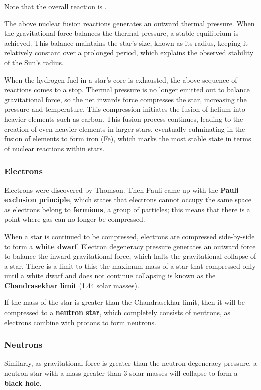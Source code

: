 \documentclass[12pt,a4paper]{article}
\begin{document}
Note that the overall reaction is .

The above nuclear fusion reactions generates an outward thermal pressure. When the gravitational force balances the thermal pressure, a stable equilibrium is achieved. This balance maintains the star's size, known as its radius, keeping it relatively constant over a prolonged period, which explains the observed stability of the Sun's radius.

When the hydrogen fuel in a star's core is exhausted, the above sequence of reactions comes to a stop. Thermal pressure is no longer emitted out to balance gravitational force, so the net inwards force compresses the star, increasing the pressure and temperature. This compression initiates the fusion of helium into heavier elements such as carbon. This fusion process continues, leading to the creation of even heavier elements in larger stars, eventually culminating in the fusion of elements to form iron (Fe), which marks the most stable state in terms of nuclear reactions within stars.

\subsubsection{Electrons}
Electrons were discovered by Thomson. Then Pauli came up with the \textbf{Pauli exclusion principle}, which states that electrons cannot occupy the same space as electrons belong to \textbf{fermions}, a group of particles; this means that there is a point where gas can no longer be compressed.

When a star is continued to be compressed, electrons are compressed side-by-side to form a \textbf{white dwarf}. Electron degeneracy pressure generates an outward force to balance the inward gravitational force, which halts the gravitational collapse of a star. There is a limit to this: the maximum mass of a star that compressed only until a white dwarf and does not continue collapsing is known as the \textbf{Chandrasekhar limit} (1.44 solar masses).

If the mass of the star is greater than the Chandrasekhar limit, then it will be compressed to a \textbf{neutron star}, which completely consists of neutrons, as electrons combine with protons to form neutrons.

\subsubsection{Neutrons}
Similarly, as gravitational force is greater than the neutron degeneracy pressure, a neutron star with a mass greater than 3 solar masses will collapse to form a \textbf{black hole}.
\end{document}
